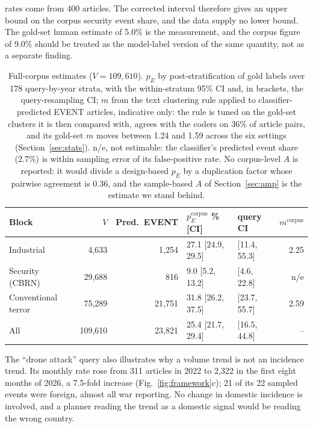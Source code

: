 \documentclass[1p,times]{elsarticle}
\begin{document}
rates come from 400 articles. The corrected interval therefore gives an upper bound on the corpus security event share, and the data supply no lower bound. The gold-set human estimate of 5.0\% is the measurement, and the corpus figure of 9.0\% should be treated as the model-label version of the same quantity, not as a separate finding.

\begin{table}[!htb]
\centering\small
\caption{Full-corpus estimates ($V = 109{,}610$). $p_E$ by post-stratification of gold labels over 178 query-by-year strata, with the within-stratum 95\% CI and, in brackets, the query-resampling CI; $m$ from the text clustering rule applied to classifier-predicted EVENT articles, indicative only: the rule is tuned on the gold-set clusters it is then compared with, agrees with the coders on 36\% of article pairs, and its gold-set $m$ moves between 1.24 and 1.59 across the six settings (Section~\ref{sec:stats}). n/e, not estimable: the classifier's predicted event share (2.7\%) is within sampling error of its false-positive rate. No corpus-level $A$ is reported: it would divide a design-based $p_E$ by a duplication factor whose pairwise agreement is 0.36, and the sample-based $A$ of Section~\ref{sec:amp} is the estimate we stand behind.}
\label{tab:fullcorpus}
\setlength{\tabcolsep}{3pt}
\begin{tabular*}{\textwidth}{@{\extracolsep{\fill}}lrrllr@{}}
\toprule
Block & $V$ & Pred.\ EVENT & $p_E^{\mathrm{corpus}}$ \% [CI] & query CI & $m^{\mathrm{corpus}}$ \\
\midrule
Industrial & 4,633 & 1,254 & 27.1 [24.9, 29.5] & [11.4, 55.3] & 2.25 \\
Security (CBRN) & 29,688 & 816 & 9.0 [5.2, 13.2] & [4.6, 22.8] & n/e \\
Conventional terror & 75,289 & 21,751 & 31.8 [26.2, 37.5] & [23.7, 55.7] & 2.59 \\
All & 109,610 & 23,821 & 25.4 [21.7, 29.4] & [16.5, 44.8] & -- \\
\bottomrule
\end{tabular*}
\end{table}

The ``drone attack'' query also illustrates why a volume trend is not an incidence trend. Its monthly rate rose from 311 articles in 2022 to 2,322 in the first eight months of 2026, a 7.5-fold increase (Fig.~\ref{fig:framework}c); 21 of its 22 sampled events were foreign, almost all war reporting. No change in domestic incidence is involved, and a planner reading the trend as a domestic signal would be reading the wrong country.
\end{document}
